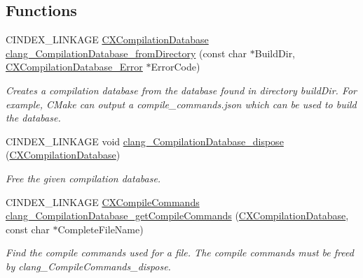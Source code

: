 \subsection*{Functions}
\begin{DoxyCompactItemize}
\item 
C\+I\+N\+D\+E\+X\+\_\+\+L\+I\+N\+K\+A\+GE \mbox{\hyperlink{group__COMPILATIONDB_gaecfc6e98d321bc436061472f4e4f84b2}{C\+X\+Compilation\+Database}} \mbox{\hyperlink{group__COMPILATIONDB_gae0822a6a54afaea92bad5d3b3256bf26}{clang\+\_\+\+Compilation\+Database\+\_\+from\+Directory}} (const char $\ast$Build\+Dir, \mbox{\hyperlink{group__COMPILATIONDB_gaf3d54e270b01e34f9db65579014255f8}{C\+X\+Compilation\+Database\+\_\+\+Error}} $\ast$Error\+Code)
\begin{DoxyCompactList}\small\item\em Creates a compilation database from the database found in directory build\+Dir. For example, C\+Make can output a compile\+\_\+commands.\+json which can be used to build the database. \end{DoxyCompactList}\item 
\mbox{\label{group__COMPILATIONDB_ga9c9a62e39662323d5d88b7f8d22a3129}} 
C\+I\+N\+D\+E\+X\+\_\+\+L\+I\+N\+K\+A\+GE void \mbox{\hyperlink{group__COMPILATIONDB_ga9c9a62e39662323d5d88b7f8d22a3129}{clang\+\_\+\+Compilation\+Database\+\_\+dispose}} (\mbox{\hyperlink{group__COMPILATIONDB_gaecfc6e98d321bc436061472f4e4f84b2}{C\+X\+Compilation\+Database}})
\begin{DoxyCompactList}\small\item\em Free the given compilation database. \end{DoxyCompactList}\item 
\mbox{\label{group__COMPILATIONDB_gad6c072a878af02ef344590b96d7613e2}} 
C\+I\+N\+D\+E\+X\+\_\+\+L\+I\+N\+K\+A\+GE \mbox{\hyperlink{group__COMPILATIONDB_gab8bb09eb53b86dbd645dc3ed2b6b7248}{C\+X\+Compile\+Commands}} \mbox{\hyperlink{group__COMPILATIONDB_gad6c072a878af02ef344590b96d7613e2}{clang\+\_\+\+Compilation\+Database\+\_\+get\+Compile\+Commands}} (\mbox{\hyperlink{group__COMPILATIONDB_gaecfc6e98d321bc436061472f4e4f84b2}{C\+X\+Compilation\+Database}}, const char $\ast$Complete\+File\+Name)
\begin{DoxyCompactList}\small\item\em Find the compile commands used for a file. The compile commands must be freed by {\ttfamily clang\+\_\+\+Compile\+Commands\+\_\+dispose}. \end{DoxyCompactList}\item 

\end{DoxyCompactItemize}
